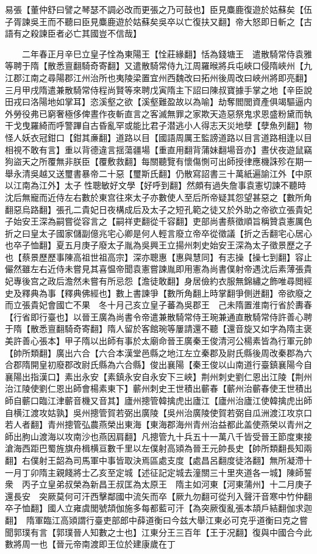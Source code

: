 易張【董仲舒曰譬之琴瑟不調必改而更張之乃可鼓也】臣見麋鹿復遊於姑蘇矣【伍子胥諫吳王而不聽曰臣見麋鹿遊於姑蘇矣吳卒以亡復扶又翻】帝大怒即日斬之【古語有之殺諫臣者必亡其國豈不信哉】

　　二年春正月辛巳立皇子恮為東陽王【恮莊緣翻】恬為錢塘王　遣散騎常侍袁雅等聘于隋【散悉亶翻騎奇寄翻】又遣散騎常侍九江周羅㬋將兵屯峽口侵隋峽州【九江郡江南之尋陽郡江州治所也夷陵梁置宜州西魏改曰拓州後周改曰峽州將即亮翻】三月甲戌隋遣兼散騎常侍程尚賢等來聘戊寅隋主下詔曰陳叔寶據手掌之地【辛臣說田戎曰洛陽地如掌耳】恣溪壑之欲【溪壑難盈故以為喻】劫奪閻閭資產俱竭驅逼内外勞役弗已窮奢極侈俾晝作夜斬直言之客滅無罪之家欺天造惡祭鬼求恩盛粉黛而執干戈曳羅綺而呼警蹕自古昏亂罕或能比君子潜逃小人得志天災地孽【孽魚列翻】物怪人妖衣冠鉗口【鉗其亷翻】道路以目【國語周厲王監謗道路以目言道路相逢以目相視不敢有言】重以背德違言揺蕩疆場【重直用翻背蒲妹翻場音亦】晝伏夜遊鼠竊狗盜天之所覆無非朕臣【覆敷救翻】每關聽覽有懷傷惻可出師授律應機誅殄在期一舉永清吳越又送璽書暴帝二十惡【璽斯氏翻】仍散寫詔書三十萬紙遍諭江外【中原以江南為江外】太子性聰敏好文學【好呼到翻】然頗有過失詹事袁憲切諫不聽時沈后無寵而近侍左右數於東宫往來太子亦數使人至后所帝疑其怨望甚惡之【數所角翻惡烏路翻】張孔二貴妃日夜構成后及太子之短孔範之徒又於外助之帝欲立張貴妃子始安王深為嗣嘗從容言之【嗣祥吏翻從千容翻】吏部尚書蔡徵順旨稱贊袁憲厲色折之曰皇太子國家儲副億兆宅心卿是何人輕言廢立帝卒從徵議【折之舌翻宅心居心也卒子恤翻】夏五月庚子廢太子胤為吳興王立揚州刺史始安王深為太子徵景歷之子也【蔡景歷歷事陳高祖世祖高宗】深亦聰惠【惠與慧同】有志操【操七到翻】容止儼然雖左右近侍未嘗見其喜愠帝聞袁憲嘗諫胤即用憲為尚書僕射帝遇沈后素薄張貴妃專後宫之政后澹然未嘗有所忌怨【澹徒敢翻】身居儉約衣服無錦繡之飾唯尋閲經史及釋典為事【釋典佛經也】數上書諫爭【數所角翻上時掌翻爭側迸翻】帝欲廢之而立張貴妃會國亡不果　冬十月己亥立皇子蕃為吳郡王　己未隋置淮南行省於夀春【行省即行臺也】以晉王廣為尚書令帝遣兼散騎常侍王琬兼通直散騎常侍許善心聘于隋【散悉亶翻騎奇寄翻】隋人留於客館琬等屢請還不聽【還音旋又如字為隋主褒美許善心張本】甲子隋以出師有事於太廟命晉王廣秦王俊清河公楊素皆為行軍元帥【帥所類翻】廣出六合【六合本漢堂邑縣之地江左立秦郡及尉氏縣後周改秦郡為六合郡隋開皇初廢郡改尉氏縣為六合縣】俊出襄陽【秦王俊以山南道行臺鎮襄陽今自襄陽出指漢口】素出永安【素鎮永安自永安下三峽】荆州刺史劉仁恩出江陵【荆州治江陵使劉仁恩出師會楊素東下】蘄州刺史王世積出蘄春【蘄州治蘄春使王世積出師自蘄口臨江津蘄音機又音其】廬州摠管韓擒虎出廬江【廬州治廬江使韓擒虎出師自横江渡攻姑孰】吳州摠管賀若弼出廣陵【吳州治廣陵使賀若弼自瓜洲渡江攻京口若人者翻】青州摠管弘農燕榮出東海【東海郡海州青州治益都此盖使燕榮以青州之師出朐山渡海以攻南沙也燕因肩翻】凡摠管九十兵五十一萬八千皆受晉王節度東接滄海西距巴蜀旌旗舟楫横亘數千里以左僕射高熲為晉王元帥長史【帥所類翻長知兩翻】右僕射王韶為司馬軍中事皆取決焉區處支度【處昌呂翻度徒洛翻】無所凝滯十一月丁卯隋主親餞將士乙亥至定城【述征記定城去潼關三十里夾道各一城】陳師誓衆　丙子立皇弟叔榮為新昌王叔匡為太原王　隋主如河東【河東蒲州】十二月庚子還長安　突厥莫何可汗西擊鄰國中流矢而卒【厥九勿翻可從刋入聲汗音寒中竹仲翻卒子恤翻】國人立雍虞閭號頡伽施多每都藍可汗【為突厥復亂張本頡戶結翻伽求迦翻】　隋軍臨江高熲謂行臺吏部郎中薛道衡曰今兹大舉江東必可克乎道衡曰克之嘗聞郭璞有言【郭璞晉人知數之士也】江東分王三百年【王于况翻】復與中國合今此數將周一也【晉元帝南渡即王位於建康歲在丁